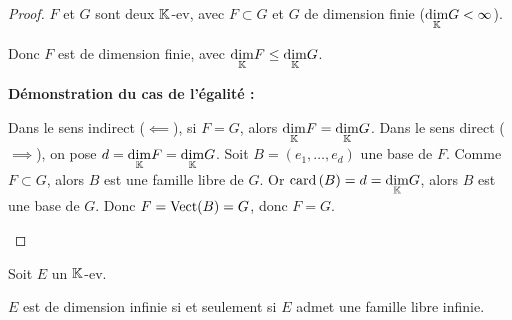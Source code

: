 \documentclass[12pt,a4paper]{report}
\begin{document}
\begin{proof}
    $F$ et $G$ sont deux $\mathbb{K}$-ev, avec $F \subset G$ et $G$ de dimension finie ($\underset{\mathbb{K}}\dim G < \infty$).

    Donc $F$ est de dimension finie, avec $\underset{\mathbb{K}}\dim F \le \underset{\mathbb{K}}\dim G$.

    \textbf{Démonstration du cas de l'égalité :}
    \begin{outline}
        \1 Dans le sens indirect ($\impliedby$), si $F = G$, alors $\underset{\mathbb{K}}\dim F = \underset{\mathbb{K}}\dim G$.
        \1 Dans le sens direct ($\implies$), on pose $d = \underset{\mathbb{K}}\dim F = \underset{\mathbb{K}}\dim G$.
        \2 Soit $B = (e_1,\dots,e_d)$ une base de $F$.
        \2 Comme $F \subset G$, alors $B$ est une famille libre de $G$.
        \2 Or $\mathrm{card}\left(B\right) = d = \underset{\mathbb{K}}\dim G$, alors $B$ est une base de $G$.
        \2 Donc $F = \mathrm{Vect}(B) = G$, donc $F = G$.
    \end{outline}
\end{proof}

\begin{property}
    Soit $E$ un $\mathbb{K}$-ev.

    $E$ est de dimension infinie si et seulement si $E$ admet une famille libre infinie.
\end{property}
\end{document}
